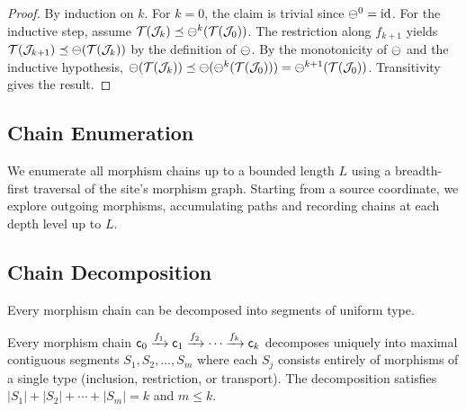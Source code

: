 \documentclass[11pt]{article}
\begin{document}
\begin{proof}
By induction on $k$.  For $k = 0$, the claim is trivial since
$\ominus^0 = \mathrm{id}$.  For the inductive step, assume
$\mathcal{T}(\mathcal{J}_k) \preceq \ominus^k(\mathcal{T}(\mathcal{J}_0))$.  The restriction along
$f_{k+1}$ yields $\mathcal{T}(\mathcal{J}_{k+1}) \preceq \ominus(\mathcal{T}(\mathcal{J}_k))$ by the
definition of $\ominus$.  By the monotonicity of $\ominus$ and the
inductive hypothesis,
$\ominus(\mathcal{T}(\mathcal{J}_k)) \preceq \ominus(\ominus^k(\mathcal{T}(\mathcal{J}_0)))
= \ominus^{k+1}(\mathcal{T}(\mathcal{J}_0))$.
Transitivity gives the result.
\end{proof}

\subsection{Chain Enumeration}
We enumerate all morphism chains up to a bounded length $L$ using a
breadth-first traversal of the site's morphism graph.  Starting from a
source coordinate, we explore outgoing morphisms, accumulating paths and
recording chains at each depth level up to $L$.

\subsection{Chain Decomposition}\label{sec:chain-decomp}

Every morphism chain can be decomposed into segments of uniform type.

\begin{theorem}\label{thm:chain-decomp}
Every morphism chain $\mathsf{c}_0 \xrightarrow{f_1} \mathsf{c}_1 \xrightarrow{f_2}
\cdots \xrightarrow{f_k} \mathsf{c}_k$ decomposes uniquely into maximal
contiguous segments $S_1, S_2, \ldots, S_m$ where each $S_j$ consists
entirely of morphisms of a single type (inclusion, restriction, or
transport).  The decomposition satisfies $|S_1| + |S_2| + \cdots + |S_m| = k$
and $m \leq k$.
\end{theorem}
\end{document}
